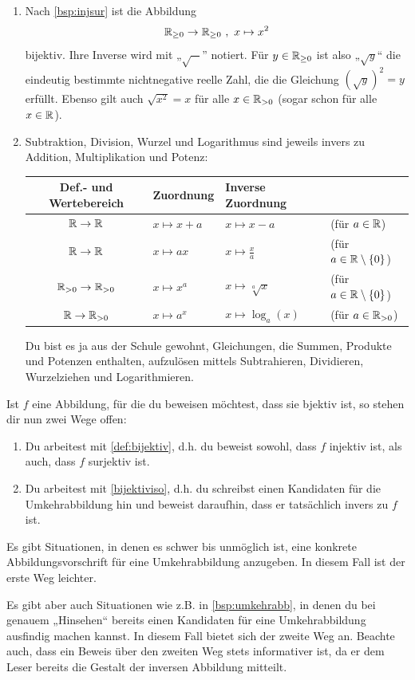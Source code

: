 \begin{bsp} \quad
    \begin{enumerate}
        \item Nach \cref{bsp:injsur} ist die Abbildung
            \[ \mathbb R_{\ge 0} \to \mathbb R_{\ge 0} \ ,\ x \mapsto x^2 \]
        bijektiv. Ihre Inverse wird mit „$\sqrt{-}$” notiert. Für $y\in \mathbb R_{\ge 0}$ ist also „$\sqrt{y}$“ die eindeutig bestimmte nichtnegative reelle Zahl, die die Gleichung $(\sqrt{y})^2=y$ erfüllt. Ebenso gilt auch $\sqrt{x^2}=x$ für alle $x\in \mathbb R_{>0}$ (sogar schon für alle $x\in \mathbb R$).
        \item Subtraktion, Division, Wurzel und Logarithmus sind jeweils invers zu Addition, Multiplikation und Potenz:
        \begin{center}
        \begin{tabular}{clll}
            Def.- und Wertebereich & Zuordnung & Inverse Zuordnung & \phantom{Platzhalter}\\
            \midrule
            $\mathbb R\to \mathbb R$ & $x\mapsto x+a$ & $x\mapsto x-a$ & (für $a\in \mathbb R$)\\
            $\mathbb R\to \mathbb R$ & $x\mapsto ax$ & $x\mapsto \frac{x}{a}$ & (für $a\in \mathbb R\setminus \{0\}$) \\
            $\mathbb R_{> 0} \to \mathbb R_{> 0}$ & $x\mapsto x^a$ & $x\mapsto \sqrt[a]{x}$ & (für $a\in \mathbb R\setminus \{0\}$) \\
            $\mathbb R \to \mathbb R_{>0}$ & $x \mapsto a^x$ & $x \mapsto \log_a(x)$ & (für $a\in \mathbb R_{>0}$)
        \end{tabular}
        \end{center}
        Du bist es ja aus der Schule gewohnt, Gleichungen, die Summen, Produkte und Potenzen enthalten, aufzulösen mittels Subtrahieren, Dividieren, Wurzelziehen und Logarithmieren.
    \end{enumerate}
\end{bsp}


\begin{bem}
    Ist $f$ eine Abbildung, für die du beweisen möchtest, dass sie bjektiv ist, so stehen dir nun zwei Wege offen:
    \begin{enumerate}
        \item Du arbeitest mit \cref{def:bijektiv}, d.h. du beweist sowohl, dass $f$ injektiv ist, als auch, dass $f$ surjektiv ist.
        \item Du arbeitest mit \cref{bijektiviso}, d.h. du schreibst einen Kandidaten für die Umkehrabbildung hin und beweist daraufhin, dass er tatsächlich invers zu $f$ ist.
    \end{enumerate}
    Es gibt Situationen, in denen es schwer bis unmöglich ist, eine konkrete Abbildungsvorschrift für eine Umkehrabbildung anzugeben. In diesem Fall ist der erste Weg leichter.
    
    Es gibt aber auch Situationen wie z.B. in \cref{bsp:umkehrabb}, in denen du bei genauem „Hinsehen“ bereits einen Kandidaten für eine Umkehrabbildung ausfindig machen kannst. In diesem Fall bietet sich der zweite Weg an. Beachte auch, dass ein Beweis über den zweiten Weg stets informativer ist, da er dem Leser bereits die Gestalt der inversen Abbildung mitteilt.
\end{bem}


